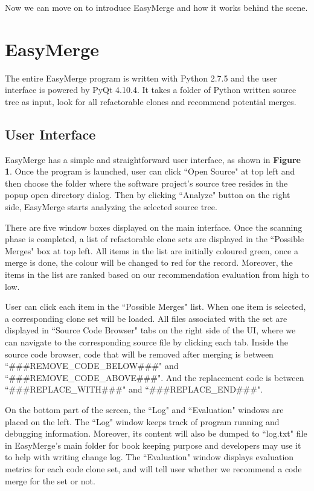 \documentclass{acm_proc_article-sp}
\begin{document}
Now we can move on to introduce EasyMerge and how it works behind the scene.


\section{EasyMerge}
The entire EasyMerge program is written with Python 2.7.5 and the user interface is powered by PyQt 4.10.4.
It takes a folder of Python written source tree as input, look for all refactorable clones and recommend potential merges.  

\subsection{User Interface}
EasyMerge has a simple and straightforward user interface, as shown in {\bf Figure 1}.
Once the program is launched, user can click ``Open Source" at top left and then choose the folder 
where the software project's source tree resides in the popup open directory dialog.
Then by clicking ``Analyze" button on the right side, EasyMerge starts analyzing the selected source tree.

There are five window boxes displayed on the main interface.
Once the scanning phase is completed, a list of refactorable clone sets are displayed in the ``Possible Merges" box at top left.
All items in the list are initially coloured green, once a merge is done, the colour will be changed to red for the record. Moreover,
the items in the list are ranked based on our recommendation evaluation from high to low.

User can click each item in the ``Possible Merges" list. When one item is selected, a corresponding clone set will be loaded. All files
associated with the set are displayed in ``Source Code Browser" tabs on the right side of the UI, where we can navigate to the
corresponding source file by clicking each tab.
Inside the source code browser, code that will be removed after merging is between ``\#\#\#REMOVE\_CODE\_BELOW\#\#\#"
and ``\#\#\#REMOVE\_CODE\_ABOVE\#\#\#". And the replacement code is between ``\#\#\#REPLACE\_WITH\#\#\#"
and ``\#\#\#REPLACE\_END\#\#\#".

On the bottom part of the screen, the ``Log" and ``Evaluation" windows are placed on the left. The ``Log" window keeps track of
program running and debugging information. Moreover, its content will also be dumped to ``log.txt" file in EasyMerge's main folder for
book keeping purpose and developers may use it to help with writing change log. The ``Evaluation" window displays evaluation metrics
for each code clone set, and will tell user whether we recommend a code merge for the set or not.
\end{document}
